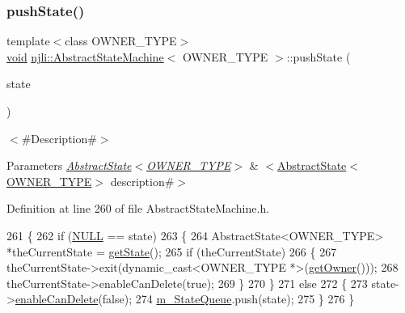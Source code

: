 \subsubsection{\texorpdfstring{push\+State()}{pushState()}}
{\footnotesize\ttfamily template$<$class O\+W\+N\+E\+R\+\_\+\+T\+Y\+PE$>$ \\
\mbox{\hyperlink{_thread_8h_af1e856da2e658414cb2456cb6f7ebc66}{void}} \mbox{\hyperlink{classnjli_1_1_abstract_state_machine}{njli\+::\+Abstract\+State\+Machine}}$<$ O\+W\+N\+E\+R\+\_\+\+T\+Y\+PE $>$\+::push\+State (\begin{DoxyParamCaption}\item[{\mbox{\hyperlink{classnjli_1_1_abstract_state}{Abstract\+State}}$<$ O\+W\+N\+E\+R\+\_\+\+T\+Y\+PE $>$ $\ast$}]{state }\end{DoxyParamCaption})}

$<$\#\+Description\#$>$


\begin{DoxyParams}{Parameters}
{\em \mbox{\hyperlink{classnjli_1_1_abstract_state}{Abstract\+State$<$\+O\+W\+N\+E\+R\+\_\+\+T\+Y\+P\+E$>$}}} & $<$\mbox{\hyperlink{classnjli_1_1_abstract_state}{Abstract\+State$<$\+O\+W\+N\+E\+R\+\_\+\+T\+Y\+P\+E$>$}} description\#$>$ \\
\hline
\end{DoxyParams}


Definition at line 260 of file Abstract\+State\+Machine.\+h.


\begin{DoxyCode}
261   \{
262     \textcolor{keywordflow}{if} (\mbox{\hyperlink{_abstract_state_8h_a070d2ce7b6bb7e5c05602aa8c308d0c4}{NULL}} == state)
263       \{
264         AbstractState<OWNER\_TYPE> *theCurrentState = \mbox{\hyperlink{classnjli_1_1_abstract_state_machine_a026a33bc918f423304b442e0dfaa046e}{getState}}();
265         \textcolor{keywordflow}{if} (theCurrentState)
266           \{
267             theCurrentState->exit(dynamic\_cast<OWNER\_TYPE *>(\mbox{\hyperlink{classnjli_1_1_abstract_state_machine_aabf808253d72265695e03c299a434798}{getOwner}}()));
268             theCurrentState->enableCanDelete(\textcolor{keyword}{true});
269           \}
270       \}
271     \textcolor{keywordflow}{else}
272       \{
273         state->\mbox{\hyperlink{classnjli_1_1_abstract_state_a4ed007508bd8f80af668a302376b7d1a}{enableCanDelete}}(\textcolor{keyword}{false});
274         \mbox{\hyperlink{classnjli_1_1_abstract_state_machine_afc1c0619e024e807c01802979d5ef3db}{m\_StateQueue}}.push(state);
275       \}
276   \}
\end{DoxyCode}
\mbox{\label{classnjli_1_1_abstract_state_machine_a4fc4bcd9d1930911474210c047372fc0}} 
